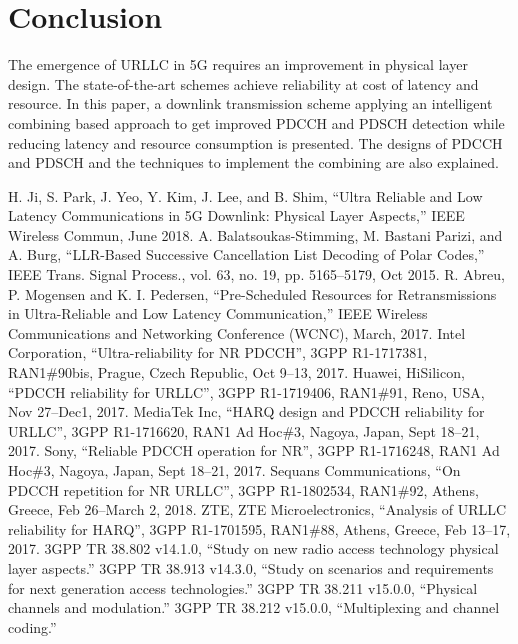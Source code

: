 \documentclass[conference,10pt]{IEEEtran}
\begin{document}
\section{Conclusion}

The emergence of URLLC in 5G requires an improvement in physical layer design. The state-of-the-art schemes achieve reliability at cost of latency and resource. In this paper, a downlink transmission scheme applying an intelligent combining based approach to get improved PDCCH and PDSCH detection while reducing latency and resource consumption is presented. The designs of PDCCH and PDSCH and the techniques to implement the combining are also explained. 

\begin{thebibliography}{00}
 H. Ji, S. Park, J. Yeo, Y. Kim, J. Lee, and B. Shim, ``Ultra Reliable and Low Latency Communications in 5G Downlink: Physical Layer Aspects,''  IEEE Wireless Commun, June 2018.
 A. Balatsoukas-Stimming, M. Bastani Parizi, and A. Burg, ``LLR-Based Successive Cancellation List Decoding of Polar Codes,'' IEEE Trans. Signal Process., vol. 63, no. 19, pp. 5165–5179, Oct 2015.
 R. Abreu, P. Mogensen and K. I. Pedersen, ``Pre-Scheduled Resources for Retransmissions in Ultra-Reliable and Low Latency Communication,'' IEEE Wireless Communications and Networking Conference (WCNC), March, 2017.
 Intel Corporation, ``Ultra-reliability for NR PDCCH'', 3GPP R1-1717381, RAN1\#90bis, Prague, Czech Republic, Oct 9--13, 2017.
 Huawei, HiSilicon, ``PDCCH reliability for URLLC'', 3GPP R1-1719406, RAN1\#91, Reno, USA, Nov 27--Dec1, 2017.
 MediaTek Inc, ``HARQ design and PDCCH reliability for URLLC'', 3GPP R1-1716620, RAN1 Ad Hoc\#3, Nagoya, Japan, Sept 18--21, 2017.
 Sony, ``Reliable PDCCH operation for NR'', 3GPP R1-1716248, RAN1 Ad Hoc\#3, Nagoya, Japan, Sept 18--21, 2017.
 Sequans Communications, ``On PDCCH repetition for NR URLLC'', 3GPP R1-1802534, RAN1\#92, Athens, Greece, Feb 26--March 2, 2018.
 ZTE, ZTE Microelectronics, ``Analysis of URLLC reliability for HARQ'', 3GPP R1-1701595, RAN1\#88, Athens, Greece, Feb 13--17, 2017.
 3GPP TR 38.802 v14.1.0, ``Study on new radio access technology physical layer aspects.''
 3GPP TR 38.913 v14.3.0, ``Study on scenarios and requirements for next generation access technologies.''
 3GPP TR 38.211 v15.0.0, ``Physical channels and modulation.''
 3GPP TR 38.212 v15.0.0, ``Multiplexing and channel coding.''

\end{thebibliography}
\vspace{12pt}
\end{document}
